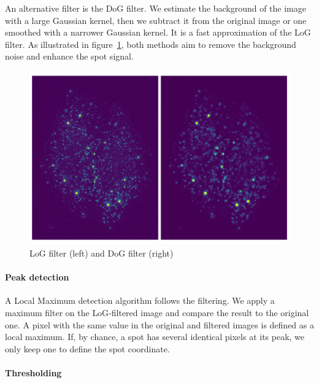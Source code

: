 An alternative filter is the \ac{DoG} filter.
We estimate the background of the image with a large Gaussian kernel, then we subtract it from the original image or one smoothed with a narrower Gaussian kernel.
It is a fast approximation of the \ac{LoG} filter.
As illustrated in figure~\ref{fig:filters_detection}, both methods aim to remove the background noise and enhance the spot signal.


\begin{figure}[h]
    \centering
    \includegraphics[width=1\textwidth]{figures/chapter2/filter_background}
    \caption{\ac{LoG} filter (left) and \ac{DoG} filter (right)}
    \label{fig:filters_detection}
\end{figure}

\paragraph{Peak detection}

A Local Maximum detection algorithm follows the filtering.
We apply a maximum filter on the \ac{LoG}-filtered image and compare the result to the original one.
A pixel with the same value in the original and filtered images is defined as a local maximum.
If, by chance, a spot has several identical pixels at its peak, we only keep one to define the spot coordinate.


\paragraph{Thresholding}

